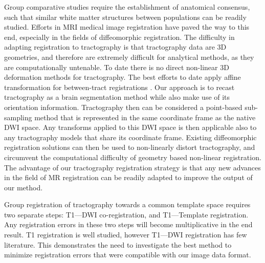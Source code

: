Group comparative studies require the establishment of anatomical consensus, such that similar white matter structures between populations can be readily studied. Efforts in MRI medical image registration have paved the way to this end, especially in the fields of diffeomorphic registration. The difficulty in adapting registration to tractography is that tractography data are 3D geometries, and therefore are extremely difficult for analytical methods, as they are computationally untenable. To date there is no direct non-linear 3D deformation methods for tractography. The best efforts to date apply affine transformation for between-tract registrations \cite{Garyfallidis2015}. Our approach is to recast tractography as a brain segmentation method while also make use of its orientation information. Tractography then can be considered a point-based sub-sampling method that is represented in the same coordinate frame as the native DWI space. Any transforms applied to this DWI space is then applicable also to any tractography models that share its coordinate frame. Existing diffeomorphic registration solutions can then be used to non-linearly distort tractography, and circumvent the computational difficulty of geometry based non-linear registration. The advantage of our tractography registration strategy is that any new advances in the field of MR registration can be readily adapted to improve the output of our method. 

Group registration of tractography towards a common template space requires two separate steps: T1---DWI co-registration, and T1---Template registration. Any registration errors in these two steps will become multiplicative in the end result. T1 registration is well studied, however T1---DWI registration has few literature. This demonstrates the need to investigate the best method to minimize registration errors that were compatible with our image data format.

